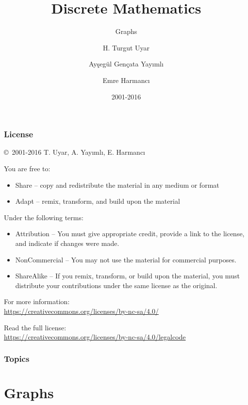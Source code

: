 \documentclass[dvipsnames]{beamer}
\title{Discrete Mathematics}
\subtitle{Graphs}
\author{H. Turgut Uyar \and Ayşegül Gençata Yayımlı \and Emre Harmancı}
\date{2001-2016}
\begin{document}
\begin{frame}
  \titlepage
\end{frame}

\begin{frame}
  \frametitle{License}

  \hfill
  \copyright~2001-2016 T. Uyar, A. Yayımlı, E. Harmancı

  \vfill
  \begin{footnotesize}
    You are free to:
    \begin{itemize}
      \itemsep0em
      \item Share -- copy and redistribute the material in any medium or format
      \item Adapt -- remix, transform, and build upon the material
    \end{itemize}

    Under the following terms:
    \begin{itemize}
      \itemsep0em
      \item Attribution -- You must give appropriate credit, provide a link to
        the license, and indicate if changes were made.

      \item NonCommercial -- You may not use the material for commercial
        purposes.

      \item ShareAlike -- If you remix, transform, or build upon the material,
        you must distribute your contributions under the same license as the
        original.
    \end{itemize}
  \end{footnotesize}

  \begin{small}
    For more information:\\
    \url{https://creativecommons.org/licenses/by-nc-sa/4.0/}

    \smallskip
    Read the full license:\\
    \url{https://creativecommons.org/licenses/by-nc-sa/4.0/legalcode}
  \end{small}
\end{frame}

\begin{frame}
  \frametitle{Topics}
  \tableofcontents
\end{frame}

\section{Graphs}
\end{document}
